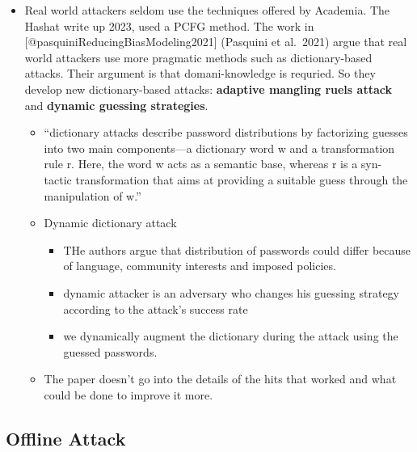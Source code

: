 \begin{itemize}
\item
  Real world attackers seldom use the techniques offered by Academia.
  The Hashat write up 2023, used a PCFG method. The work in
  {[}@pasquiniReducingBiasModeling2021{]} (Pasquini et al.~2021) argue
  that real world attackers use more pragmatic methods such as
  dictionary-based attacks. Their argument is that domani-knowledge is
  requried. So they develop new dictionary-based attacks:
  \textbf{adaptive mangling ruels attack} and \textbf{dynamic guessing
  strategies}.

  \begin{itemize}
  \item
    ``dictionary attacks describe password distributions by factorizing
    guesses into two main components---a dictionary word w and a
    transformation rule r. Here, the word w acts as a semantic base,
    whereas r is a syn- tactic transformation that aims at providing a
    suitable guess through the manipulation of w.''
  \item
    Dynamic dictionary attack

    \begin{itemize}
    \item
      THe authors argue that distribution of passwords could differ
      because of language, community interests and imposed policies.
    \item
      dynamic attacker is an adversary who changes his guessing strategy
      according to the attack's success rate
    \item
      we dynamically augment the dictionary during the attack using the
      guessed passwords.
    \end{itemize}
  \item
    The paper doesn't go into the details of the hits that worked and
    what could be done to improve it more.
  \end{itemize}
\end{itemize}


\hypertarget{offline-attack}{%
\subsection{Offline Attack}\label{offline-attack}}

